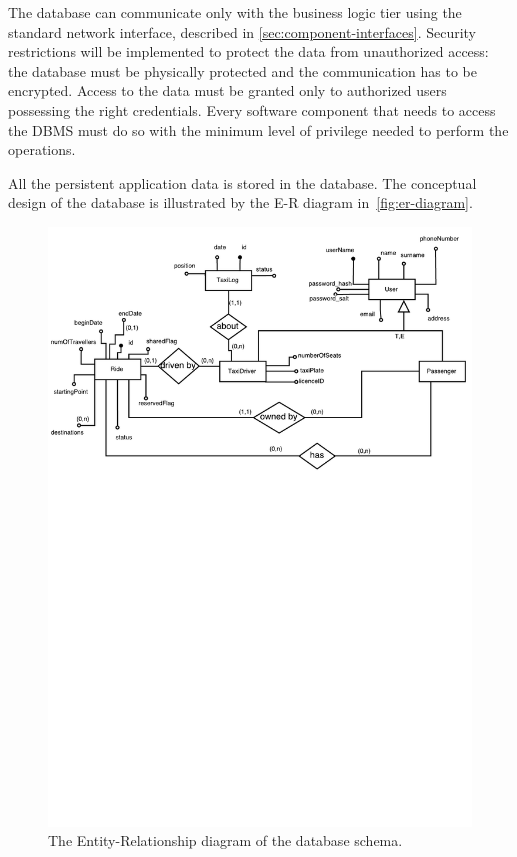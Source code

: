 The database can communicate only with the business logic tier using the standard network interface, described in \autoref{sec:component-interfaces}.
Security restrictions will be implemented to protect the data from unauthorized access: the database must be physically protected and the communication has to be encrypted. Access to the data must be granted only to authorized users possessing the right credentials. Every software component that needs to access the DBMS must do so with the minimum level of privilege needed to perform the operations.

All the persistent application data is stored in the database. The conceptual design of the database is illustrated by the E-R diagram in~\autoref{fig:er-diagram}.

\begin{figure}
    \centering
    \includegraphics[width=\textwidth]{diagrams/er_diagram}
    \caption{The Entity-Relationship diagram of the database schema.}
    \label{fig:er-diagram}
\end{figure}


